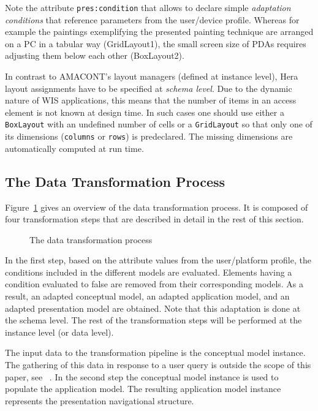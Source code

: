 \documentclass[oribibl]{llncs}
\begin{document}
Note the attribute \texttt{pres:condition} that allows to declare simple \emph{adaptation conditions} that reference parameters from the user/device profile.
Whereas for example the paintings exemplifying the presented painting technique are arranged on a PC in a tabular way (GridLayout1), the small screen size of PDAs requires adjusting them below each other (BoxLayout2).

In contrast to AMACONT's layout managers (defined at instance level), Hera layout assignments have to be specified at \emph{schema level}. 
Due to the dynamic nature of WIS applications, this means that the number of items in an access element is not known at design time.
In such cases one should use either a \texttt{BoxLayout} with an undefined number of cells or a \texttt{GridLayout} so that only one of its dimensions (\texttt{columns} or \texttt{rows}) is predeclared.
The missing dimensions are automatically computed at run time.
 

 


\subsection{The Data Transformation Process}

Figure~\ref{trans2} gives an overview of the data transformation process.
It is composed of four transformation steps that are
described in detail in the rest of this section.

\begin{figure}
\centering
{}
\caption{The data transformation process}
\label{trans2}
\end{figure}

In the first step, based on the attribute values from the user/platform profile, 
the conditions
included in the different models are evaluated. Elements having a
condition evaluated to false are removed from their corresponding models. 
As a result, an adapted conceptual model, an adapted application model, and an 
adapted presentation model are obtained. Note that this adaptation is done at the 
schema level.
The rest of the transformation steps will be performed at the 
instance level (or data level).

The input data to the transformation pipeline is the conceptual model instance.
The gathering of this data in response to a user query is outside the scope
of this paper, see ~\cite{hera:jwe}. In the second step the conceptual model instance is used to 
populate the 
application model. The resulting application model instance represents
the presentation navigational structure.
\end{document}
